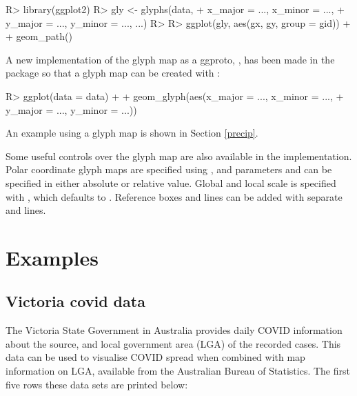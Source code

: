 \documentclass[
]{jss}
\begin{document}
\begin{CodeChunk}
\begin{CodeInput}
R> library(ggplot2)
R> gly <- glyphs(data,
+               x_major = ..., x_minor = ...,
+               y_major = ..., y_minor = ..., ...)
R> 
R> ggplot(gly, aes(gx, gy, group = gid)) +
+   geom_path()
\end{CodeInput}
\end{CodeChunk}

A new implementation of the glyph map as a ggproto, , has been made in the  package so that a glyph map can be created with :

\begin{CodeChunk}
\begin{CodeInput}
R> ggplot(data = data) +
+   geom_glyph(aes(x_major = ..., x_minor = ...,
+                  y_major = ..., y_minor = ...))
\end{CodeInput}
\end{CodeChunk}

An example using a glyph map is shown in Section \ref{precip}.

Some useful controls over the glyph map are also available in the  implementation. Polar coordinate glyph maps are specified using , and parameters  and  can be specified in either absolute or relative value. Global and local scale is specified with , which defaults to . Reference boxes and lines can be added with separate  and  lines.

\hypertarget{examples}{%
\section{Examples}\label{examples}}

\hypertarget{covid}{%
\subsection{Victoria covid data}\label{covid}}

The Victoria State Government in Australia provides daily COVID information about the source, and local government area (LGA) of the recorded cases. This data can be used to visualise COVID spread when combined with map information on LGA, available from the Australian Bureau of Statistics. The first five rows these data sets are printed below:
\end{document}
